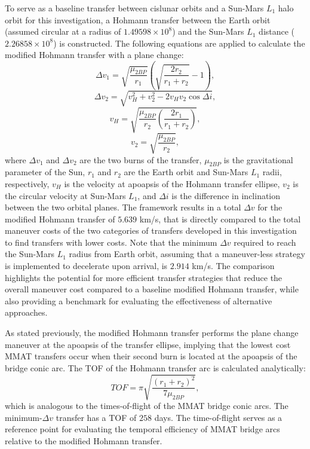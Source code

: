 To serve as a baseline transfer between cislunar orbits and a Sun-Mars $L_{1}$ halo orbit for this
investigation, a Hohmann transfer between the Earth orbit (assumed circular at a radius of
$1.49598\times10^{8}$) and the Sun-Mars $L_{1}$ distance ($2.26858\times10^{8}$) is constructed.
The following equations are applied to calculate the modified Hohmann transfer with a plane change:
\begin{equation}
    \Delta v_{1}=\sqrt{\frac{\mu_{2BP}}{r_{1}}}(\sqrt{\frac{2r_{2}}{r_{1}+r_{2}}}-1),
    \label{eq:Hohmann1}
\end{equation}
\vspace{1mm}
\begin{equation}
    \Delta v_{2}=\sqrt{v_{H}^{2}+v_{2}^{2}-2v_{H}v_{2}\cos\Delta i},
    \label{eq:Hohmann2}
\end{equation}
\vspace{1mm}
\begin{equation}
    v_{H}=\sqrt{\frac{\mu_{2BP}}{r_{2}}(\frac{2r_{1}}{r_{1}+r_{2}})},
    \label{eq:transferv}
\end{equation}
\vspace{1mm}
\begin{equation}
    v_{2}=\sqrt{\frac{\mu_{2BP}}{r_{2}}},
    \label{eq:circlev}
\end{equation}
where $\Delta v_{1}$ and $\Delta v_{2}$ are the two burns of the transfer, $\mu_{2BP}$ is the
gravitational parameter of the Sun, $r_{1}$ and $r_{2}$ are the Earth orbit and Sun-Mars $L_{1}$
radii, respectively, $v_{H}$ is the velocity at apoapsis of the Hohmann transfer ellipse, $v_{2}$
is the circular velocity at Sun-Mars $L_{1}$, and $\Delta i$ is the difference in inclination
between the two orbital planes. The framework results in a total $\Delta v$ for the modified
Hohmann transfer of $5.639$ km/s, that is directly compared to the total maneuver costs of the two
categories of transfers developed in this investigation to find transfers with lower costs. Note
that the minimum $\Delta v$ required to reach the Sun-Mars $L_{1}$ radius from Earth orbit,
assuming that a maneuver-less strategy is implemented to decelerate upon arrival, is $2.914$ km/s.
The comparison highlights the potential for more efficient transfer strategies that reduce the
overall maneuver cost compared to a baseline modified Hohmann transfer, while also providing a
benchmark for evaluating the effectiveness of alternative approaches.

As stated previously, the modified Hohmann transfer performs the plane change maneuver at the
apoapsis of the transfer ellipse, implying that the lowest cost MMAT transfers occur when their
second burn is located at the apoapsis of the bridge conic arc. The TOF of the Hohmann transfer
arc is calculated analytically:
\begin{equation}
    TOF=\pi\sqrt{\frac{(r_{1}+r_{2})^{2}}{7\mu_{2BP}}},
    \label{eq:HohmannTOF}
\end{equation}
which is analogous to the times-of-flight of the MMAT bridge conic arcs. The minimum-$\Delta v$
transfer has a TOF of $258$ days. The time-of-flight serves as a reference point for evaluating the
temporal efficiency of MMAT bridge arcs relative to the modified Hohmann transfer.
